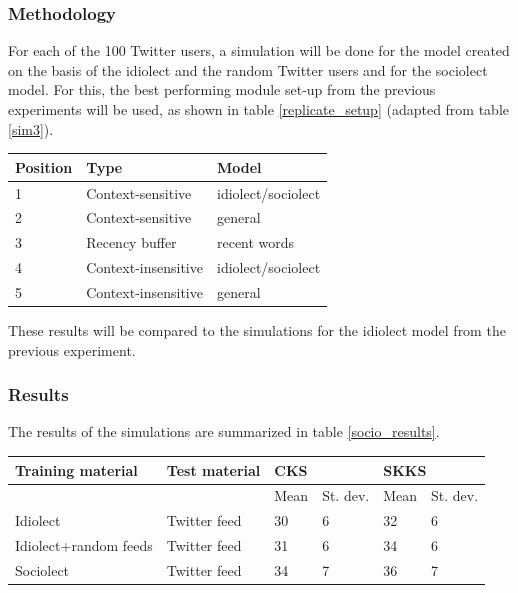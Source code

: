 \documentclass[12pt]{article}
\let\originaltable\table
\let\endoriginaltable\endtable
\renewenvironment{table}[1][ht]{%
  \originaltable[#1]
  \centering}%
  {\endoriginaltable}
\begin{document}
\subsubsection{Methodology}

For each of the 100 Twitter users, a simulation will be done for the model created on the basis of the idiolect and the random Twitter users and for the sociolect model. For this, the best performing module set-up from the previous experiments will be used, as shown in table \ref{replicate_setup} (adapted from table \ref{sim3}).

\begin{table}[H]
\begin{tabular}{lll} 
Position&Type&Model\\
\hline
1&Context-sensitive&idiolect/sociolect\\
2&Context-sensitive&general\\
3&Recency buffer&recent words\\
4&Context-insensitive&idiolect/sociolect\\
5&Context-insensitive&general\\
\end{tabular} 
\caption{The best performing module set-up} \label{replicate_setup}
\end{table}

These results will be compared to the simulations for the idiolect model from the previous experiment.

\subsubsection{Results}

The results of the simulations are summarized in table \ref{socio_results}.

\begin{table}[H] 
\centering
\begin{tabular}{ll|llll} 
Training material&Test material&\multicolumn{2}{l}{CKS}&\multicolumn{2}{l}{SKKS}\\
\hline
&&Mean&St. dev.&Mean&St. dev.\\
Idiolect&Twitter feed&30&6&32&6\\
Idiolect+random feeds&Twitter feed&31&6&34&6\\
Sociolect&Twitter feed&34&7&36&7\\
\end{tabular} 
\caption{Mean percentage of keystrokes saved when using an idiolect, an extended idiolect and a sociolect.} \label{socio_results}
\end{table}
\end{document}
